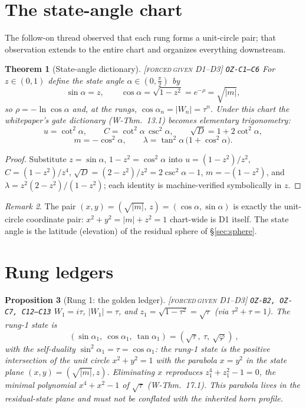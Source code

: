 \documentclass[11pt]{article}
\newcommand{\tagFD}{\textcolor{cF}{\textsc{[forced}}\,\textcolor{cD}{\textsc{given D1--D3]}}}
\newcommand{\hx}[1]{\textcolor{cC}{\footnotesize\texttt{#1}}}
\newcommand{\gp}{\varphi}
\theoremstyle{plain}
\newtheorem{theorem}{Theorem}[section]
\newtheorem{proposition}[theorem]{Proposition}
\theoremstyle{definition}
\theoremstyle{remark}
\newtheorem{remark}[theorem]{Remark}
\begin{document}
\section{The state-angle chart}\label{sec:stateangle}

The follow-on thread observed that each rung forms a unit-circle pair; that
observation extends to the entire chart and organizes everything downstream.

\begin{theorem}[State-angle dictionary]\label{thm:stateangle}\tagFD{} \hx{OZ-C1--C6}
For $z\in(0,1)$ define the \emph{state angle} $\alpha\in(0,\tfrac\pi2)$ by
\[
\sin\alpha=z,\qquad \cos\alpha=\sqrt{1-z^2}=e^{-\rho}=\sqrt{|m|},
\]
so $\rho=-\ln\cos\alpha$ and, at the rungs, $\cos\alpha_n=|W_n|=\tau^n$.
Under this chart the whitepaper's gate dictionary (W-Thm.\ 13.1) becomes
elementary trigonometry:
\[
u=\cot^2\alpha,\qquad
C=\cot^2\alpha\,\csc^2\alpha,\qquad
\sqrt D=1+2\cot^2\alpha,
\]
\[
m=-\cos^2\alpha,\qquad
\lambda=\tan^2\alpha\,\bigl(1+\cos^2\alpha\bigr).
\]
\end{theorem}

\begin{proof}
Substitute $z=\sin\alpha$, $1-z^2=\cos^2\alpha$ into $u=(1-z^2)/z^2$,
$C=(1-z^2)/z^4$, $\sqrt D=(2-z^2)/z^2=2\csc^2\alpha-1$,
$m=-(1-z^2)$, and $\lambda=z^2(2-z^2)/(1-z^2)$; each identity is
machine-verified symbolically in $z$.
\end{proof}

\begin{remark}
The pair $(x,y)=(\sqrt{|m|},\,z)=(\cos\alpha,\sin\alpha)$ is exactly the
unit-circle coordinate pair: $x^2+y^2=|m|+z^2=1$ chart-wide is D1 itself.
The state angle is the latitude (elevation) of the residual sphere of
\S\ref{sec:sphere}.
\end{remark}

\section{Rung ledgers}\label{sec:ledgers}

\begin{proposition}[Rung 1: the golden ledger]\label{prop:rung1}\tagFD{} \hx{OZ-B2, OZ-C7, C12--C13}
$W_1=i\tau$, $|W_1|=\tau$, and $z_1=\sqrt{1-\tau^2}=\sqrt\tau$ (via
$\tau^2+\tau=1$). The rung-1 state is
\[
\boxed{\ (\sin\alpha_1,\ \cos\alpha_1,\ \tan\alpha_1)=(\sqrt\tau,\ \tau,\ \sqrt\gp)\ },
\]
with the self-duality $\sin^2\alpha_1=\tau=\cos\alpha_1$: the rung-1 state is the
positive intersection of the unit circle $x^2+y^2=1$ with the parabola $x=y^2$ in
the state plane $(x,y)=(\sqrt{|m|},z)$. Eliminating $x$ reproduces
$z_1^4+z_1^2-1=0$, the minimal polynomial $x^4+x^2-1$ of $\sqrt\tau$
(W-Thm.\ 17.1). This parabola lives in the residual-state plane and must not be
conflated with the inherited horn profile.
\end{proposition}
\end{document}
